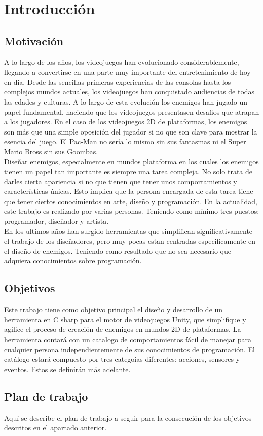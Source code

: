 \chapter{Introducción}
\label{cap:introduccion}


\section{Motivación}
A lo largo de los años, los videojuegos han evolucionado considerablemente, llegando a convertirse en una parte muy importante del entretenimiento de hoy en dia. Desde las sencillas primeras experiencias de las consolas hasta los complejos mundos actuales, los videojuegos han conquistado audiencias de todas las edades y culturas. A lo largo de esta evolución los enemigos han jugado un papel fundamental, haciendo que los videojuegos presentasen desafios que atrapan a los jugadores. 
En el caso de los videojuegos 2D de plataformas, los enemigos son más que una simple oposición del jugador si no que son clave para mostrar la esencia del juego. El Pac-Man no sería lo mismo sin sus fantasmas ni el Super Mario Bross sin sus Goombas. \\
Diseñar enemigos, especialmente en mundos plataforma en los cuales los enemigos tienen un papel tan importante es siempre una tarea compleja. No solo trata de darles cierta apariencia si no que tienen que tener unos comportamientos y características únicas.  Esto implica que la persona encargada de esta tarea tiene que tener ciertos conocimientos en arte, diseño y programación. En la actualidad, este trabajo es realizado por varias personas. Teniendo como mínimo tres puestos: programador, diseñador y artista. \\
En los ultimos años han surgido herramientas que simplifican significativamente el trabajo de los diseñadores, pero muy pocas estan centradas especificamente en el diseño de enemigos. Teniendo como resultado que no sea necesario que adquiera conocimientos sobre programación. 


\section{Objetivos}
Este trabajo tiene como objetivo principal el diseño y desarrollo de un herramienta en C sharp para el motor de videojuegos Unity, que simplifique y agilice el proceso  de creación de enemigos en mundos 2D de plataformas. La herramienta contará con un catalogo de comportamientos fácil de manejar para cualquier persona independientemente de sus conocimientos de programación. El catálogo estará compuesto por tres categoías diferentes: acciones, sensores y eventos. Estos se definirán más adelante. 

\section{Plan de trabajo}
Aquí se describe el plan de trabajo a seguir para la consecución de los objetivos descritos en el apartado anterior.

